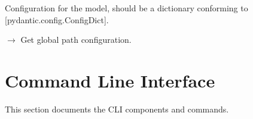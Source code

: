 \documentclass[letterpaper,10pt,english]{sphinxmanual}
\begin{document}
\begin{fulllineitems}
\begin{fulllineitems}
\end{fulllineitems}


\begin{fulllineitems}
\label{\detokenize{api/core:src.core.config.paths.PathConfig.model_config}}
\pysigstartsignatures
\pysigline
{}
\pysigstopsignatures
\sphinxAtStartPar
Configuration for the model, should be a dictionary conforming to {[}\sphinxtitleref{ConfigDict}{]}{[}pydantic.config.ConfigDict{]}.

\end{fulllineitems}


\end{fulllineitems}


\begin{fulllineitems}
\label{\detokenize{api/core:src.core.config.paths.get_path_config}}
\pysigstartsignatures
\pysiglinewithargsret
{}
{}
{{ $\rightarrow$ {\hyperref[\detokenize{api/core:src.core.config.paths.PathConfig}]{}}}}
\pysigstopsignatures
\sphinxAtStartPar
Get global path configuration.

\end{fulllineitems}


\sphinxstepscope


\section{Command Line Interface}
\label{\detokenize{api/cli:command-line-interface}}\label{\detokenize{api/cli::doc}}
\sphinxAtStartPar
This section documents the CLI components and commands.
\end{document}

